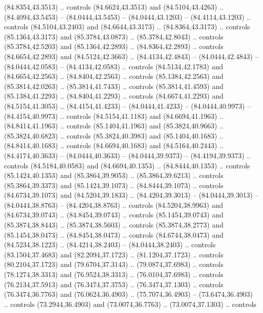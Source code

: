 \begin{scope}[cm={{1.25,0.0,0.0,-1.25,(-71.74049,81.13304)}}]
        (84.8354,43.3513) .. controls (84.6624,43.3513) and (84.5104,43.4263) ..
        (84.4094,43.5453) -- (84.0444,43.5453) -- (84.0444,43.1203) --
        (84.4114,43.1203) .. controls (84.5104,43.2403) and (84.6644,43.3173) ..
        (84.8364,43.3173) .. controls (85.1364,43.3173) and (85.3784,43.0873) ..
        (85.3784,42.8043) .. controls (85.3784,42.5203) and (85.1364,42.2893) ..
        (84.8364,42.2893) .. controls (84.6654,42.2893) and (84.5124,42.3663) ..
        (84.4134,42.4843) -- (84.0444,42.4843) -- (84.0444,42.0583) --
        (84.4134,42.0583) .. controls (84.5134,42.1783) and (84.6654,42.2563) ..
        (84.8404,42.2563) .. controls (85.1384,42.2563) and (85.3814,42.0263) ..
        (85.3814,41.7433) .. controls (85.3814,41.4593) and (85.1384,41.2293) ..
        (84.8404,41.2293) .. controls (84.6674,41.2293) and (84.5154,41.3053) ..
        (84.4154,41.4233) -- (84.0444,41.4233) -- (84.0444,40.9973) --
        (84.4154,40.9973) .. controls (84.5154,41.1183) and (84.6694,41.1963) ..
        (84.8414,41.1963) .. controls (85.1404,41.1963) and (85.3824,40.9663) ..
        (85.3824,40.6823) .. controls (85.3824,40.3983) and (85.1404,40.1683) ..
        (84.8414,40.1683) .. controls (84.6694,40.1683) and (84.5164,40.2443) ..
        (84.4174,40.3633) -- (84.0444,40.3633) -- (84.0444,39.9373) --
        (84.4194,39.9373) .. controls (84.5184,40.0583) and (84.6694,40.1353) ..
        (84.8444,40.1353) .. controls (85.1424,40.1353) and (85.3864,39.9053) ..
        (85.3864,39.6213) .. controls (85.3864,39.3373) and (85.1424,39.1073) ..
        (84.8444,39.1073) .. controls (84.6734,39.1073) and (84.5204,39.1833) ..
        (84.4204,39.3013) -- (84.0444,39.3013) -- (84.0444,38.8763) --
        (84.4204,38.8763) .. controls (84.5204,38.9963) and (84.6734,39.0743) ..
        (84.8454,39.0743) .. controls (85.1454,39.0743) and (85.3874,38.8443) ..
        (85.3874,38.5603) .. controls (85.3874,38.2773) and (85.1454,38.0473) ..
        (84.8454,38.0473) .. controls (84.6744,38.0473) and (84.5234,38.1223) ..
        (84.4214,38.2403) -- (84.0444,38.2403) .. controls (83.1504,37.4683) and
        (82.2094,37.1723) .. (81.1204,37.1723) .. controls (80.2104,37.1723) and
        (79.6704,37.3143) .. (79.0874,37.6983) .. controls (78.1274,38.3313) and
        (76.9524,38.3313) .. (76.0104,37.6983) .. controls (76.2134,37.5913) and
        (76.3474,37.3753) .. (76.3474,37.1303) .. controls (76.3474,36.7763) and
        (76.0624,36.4903) .. (75.7074,36.4903) -- (73.6474,36.4903) .. controls
        (73.2944,36.4903) and (73.0074,36.7763) .. (73.0074,37.1303) .. controls

\end{scope}
